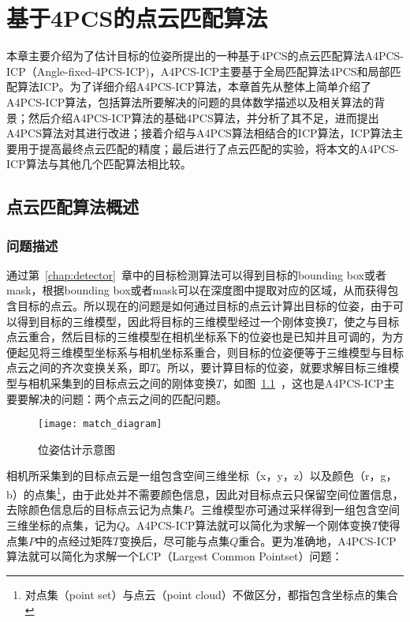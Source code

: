 \chapter{基于4PCS的点云匹配算法}
\label{chap:matcher}
本章主要介绍为了估计目标的位姿所提出的一种基于4PCS的点云匹配算法A4PCS-ICP（Angle-fixed-4PCS-ICP)，A4PCS-ICP主要基于全局匹配算法4PCS\cite{aiger20084}和局部匹配算法ICP\cite{besl1992method}。为了详细介绍A4PCS-ICP算法，本章首先从整体上简单介绍了A4PCS-ICP算法，包括算法所要解决的问题的具体数学描述以及相关算法的背景；然后介绍A4PCS-ICP算法的基础4PCS算法，并分析了其不足，进而提出A4PCS算法对其进行改进；接着介绍与A4PCS算法相结合的ICP算法，ICP算法主要用于提高最终点云匹配的精度；最后进行了点云匹配的实验，将本文的A4PCS-ICP算法与其他几个匹配算法相比较。

\section{点云匹配算法概述}
\subsection{问题描述}
通过第~\ref{chap:detector}~章中的目标检测算法可以得到目标的bounding box或者mask，根据bounding box或者mask可以在深度图中提取对应的区域，从而获得包含目标的点云。所以现在的问题是如何通过目标的点云计算出目标的位姿，由于可以得到目标的三维模型，因此将目标的三维模型经过一个刚体变换$T$，使之与目标点云重合，然后目标的三维模型在相机坐标系下的位姿也是已知并且可调的，为方便起见将三维模型坐标系与相机坐标系重合，则目标的位姿便等于三维模型与目标点云之间的齐次变换关系，即$T$。所以，要计算目标的位姿，就要求解目标三维模型与相机采集到的目标点云之间的刚体变换$T$，如图~\ref{fig:match_diagram}~，这也是A4PCS-ICP主要要解决的问题：两个点云之间的匹配问题。
\begin{figure}[ht]
  \centering
  \texttt{[image: match\_diagram]}
  \caption{位姿估计示意图}
  \label{fig:match_diagram}
\end{figure}

相机所采集到的目标点云是一组包含空间三维坐标（x，y，z）以及颜色（r，g，b）的点集\footnote{对点集（point set）与点云（point cloud）不做区分，都指包含坐标点的集合}，由于此处并不需要颜色信息，因此对目标点云只保留空间位置信息，去除颜色信息后的目标点云记为点集$P$。三维模型亦可通过采样得到一组包含空间三维坐标的点集，记为$Q$。A4PCS-ICP算法就可以简化为求解一个刚体变换$T$使得点集$P$中的点经过矩阵$T$变换后，尽可能与点集$Q$重合。更为准确地，A4PCS-ICP算法就可以简化为求解一个LCP（Largest Common Pointset）问题：

